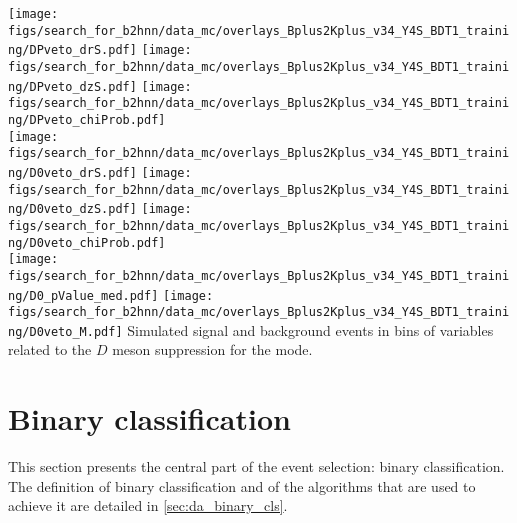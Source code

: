{
\texttt{[image: figs/search\_for\_b2hnn/data\_mc/overlays\_Bplus2Kplus\_v34\_Y4S\_BDT1\_training/DPveto\_drS.pdf]}
\texttt{[image: figs/search\_for\_b2hnn/data\_mc/overlays\_Bplus2Kplus\_v34\_Y4S\_BDT1\_training/DPveto\_dzS.pdf]}
\texttt{[image: figs/search\_for\_b2hnn/data\_mc/overlays\_Bplus2Kplus\_v34\_Y4S\_BDT1\_training/DPveto\_chiProb.pdf]}\\
\texttt{[image: figs/search\_for\_b2hnn/data\_mc/overlays\_Bplus2Kplus\_v34\_Y4S\_BDT1\_training/D0veto\_drS.pdf]}
\texttt{[image: figs/search\_for\_b2hnn/data\_mc/overlays\_Bplus2Kplus\_v34\_Y4S\_BDT1\_training/D0veto\_dzS.pdf]}
\texttt{[image: figs/search\_for\_b2hnn/data\_mc/overlays\_Bplus2Kplus\_v34\_Y4S\_BDT1\_training/D0veto\_chiProb.pdf]}\\
\texttt{[image: figs/search\_for\_b2hnn/data\_mc/overlays\_Bplus2Kplus\_v34\_Y4S\_BDT1\_training/D0\_pValue\_med.pdf]}
\texttt{[image: figs/search\_for\_b2hnn/data\_mc/overlays\_Bplus2Kplus\_v34\_Y4S\_BDT1\_training/D0veto\_M.pdf]}
}
{
Simulated signal and background events in bins of variables related to the $D$ meson suppression for the \BKpnn mode.
\overlaytext
}


\clearpage
\section{Binary classification} \label{sec:binary_classification}
This section presents the central part of the event selection: binary classification.
The definition of binary classification and of the algorithms that are used to achieve it are detailed in \cref{sec:da_binary_cls}.

